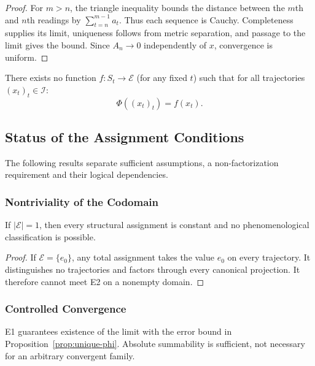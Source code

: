 \begin{proof}
For $m>n$, the triangle inequality bounds the distance between the $m$th and $n$th readings by $\sum_{t=n}^{m-1}a_t$. Thus each sequence is Cauchy. Completeness supplies its limit, uniqueness follows from metric separation, and passage to the limit gives the bound. Since $A_n\to0$ independently of $x$, convergence is uniform.
\end{proof}

\begin{axiom}\label{ax:e2}
There exists no function $f: S_t \to \mathcal{E}$ (for any fixed $t$) such that for all trajectories $(x_t)_t \in \mathcal{I}$:
\begin{equation}
    \Phi((x_t)_t) = f(x_t).
\end{equation}
\end{axiom}

\subsection{Status of the Assignment Conditions}

The following results separate sufficient assumptions, a non-factorization requirement and their logical dependencies.

\subsubsection{Nontriviality of the Codomain}

\begin{theorem}[E0 is Necessary]\label{thm:e0-necessary}
If $|\mathcal{E}| = 1$, then every structural assignment is constant and no phenomenological classification is possible.
\end{theorem}

\begin{proof}
If $\mathcal E=\{e_0\}$, any total assignment takes the value $e_0$ on every trajectory. It distinguishes no trajectories and factors through every canonical projection. It therefore cannot meet E2 on a nonempty domain.
\end{proof}

\subsubsection{Controlled Convergence}

\begin{theorem}\label{thm:e1-necessary}
E1 guarantees existence of the limit with the error bound in Proposition~\ref{prop:unique-phi}. Absolute summability is sufficient, not necessary for an arbitrary convergent family.
\end{theorem}


